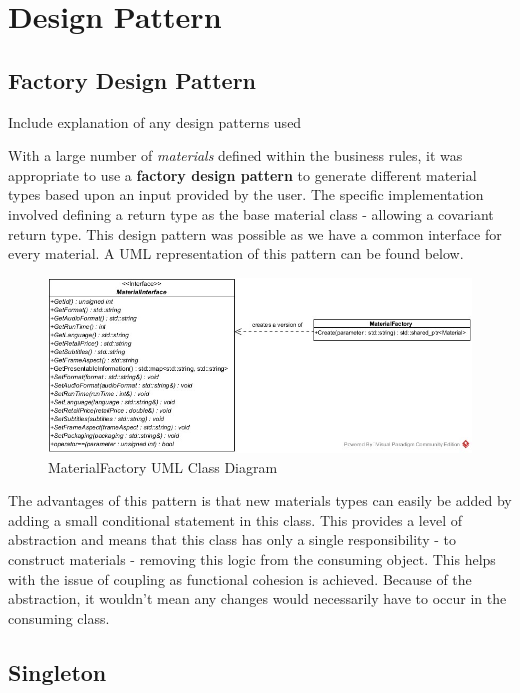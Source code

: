 \documentclass[
  english,
  a4paper,
,tablecaptionabove
]{scrartcl}
\begin{document}
\newpage

\hypertarget{design-pattern}{%
\section{Design Pattern}\label{design-pattern}}

\hypertarget{factory-design-pattern}{%
\subsection{Factory Design Pattern}\label{factory-design-pattern}}

Include explanation of any design patterns used

With a large number of \emph{materials} defined within the business
rules, it was appropriate to use a \textbf{factory design pattern} to
generate different material types based upon an input provided by the
user. The specific implementation involved defining a return type as the
base material class - allowing a covariant return type. This design
pattern was possible as we have a common interface for every material. A
UML representation of this pattern can be found below.

\begin{figure}
\centering
\includegraphics{images/class-diagrams/material-factory.jpg}
\caption{MaterialFactory UML Class Diagram}
\end{figure}

The advantages of this pattern is that new materials types can easily be
added by adding a small conditional statement in this class. This
provides a level of abstraction and means that this class has only a
single responsibility - to construct materials - removing this logic
from the consuming object. This helps with the issue of coupling as
functional cohesion is achieved. Because of the abstraction, it wouldn't
mean any changes would necessarily have to occur in the consuming class.

\hypertarget{singleton}{%
\subsection{Singleton}\label{singleton}}
\end{document}
